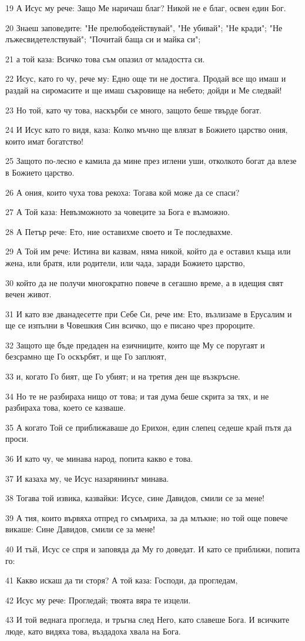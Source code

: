 \par 19 А Исус му рече: Защо Ме наричаш благ? Никой не е благ, освен един Бог.
\par 20 Знаеш заповедите: "Не прелюбодействувай", "Не убивай"; "Не кради"; "Не лъжесвидетелствувай"; "Почитай баща си и майка си";
\par 21 а той каза: Всичко това съм опазил от младостта си.
\par 22 Исус, като го чу, рече му: Едно още ти не достига. Продай все що имаш и раздай на сиромасите и ще имаш съкровище на небето; дойди и Ме следвай!
\par 23 Но той, като чу това, наскърби се много, защото беше твърде богат.
\par 24 И Исус като го видя, каза: Колко мъчно ще влязат в Божието царство ония, които имат богатство!
\par 25 Защото по-лесно е камила да мине през иглени уши, отколкото богат да влезе в Божието царство.
\par 26 А ония, които чуха това рекоха: Тогава кой може да се спаси?
\par 27 А Той каза: Невъзможното за човеците за Бога е възможно.
\par 28 А Петър рече: Ето, ние оставихме своето и Те последвахме.
\par 29 А Той им рече: Истина ви казвам, няма никой, който да е оставил къща или жена, или братя, или родители, или чада, заради Божието царство,
\par 30 който да не получи многократно повече в сегашно време, а в идещия свят вечен живот.
\par 31 И като взе дванадесетте при Себе Си, рече им: Ето, възлизаме в Ерусалим и ще се изпълни в Човешкия Син всичко, що е писано чрез пророците.
\par 32 Защото ще бъде предаден на езичниците, които ще Му се поругаят и безсрамно ще Го оскърбят, и ще Го заплюят,
\par 33 и, когато Го бият, ще Го убият; и на третия ден ще възкръсне.
\par 34 Но те не разбираха нищо от това; и тая дума беше скрита за тях, и не разбираха това, което се казваше.
\par 35 А когато Той се приближаваше до Ерихон, един слепец седеше край пътя да проси.
\par 36 И като чу, че минава народ, попита какво е това.
\par 37 И казаха му, че Исус назарянинът минава.
\par 38 Тогава той извика, казвайки: Исусе, сине Давидов, смили се за мене!
\par 39 А тия, които вървяха отпред го смъмриха, за да млъкне; но той още повече викаше: Сине Давидов, смили се за мене!
\par 40 И тъй, Исус се спря и заповяда да Му го доведат. И като се приближи, попита го:
\par 41 Какво искаш да ти сторя? А той каза: Господи, да прогледам,
\par 42 Исус му рече: Прогледай; твоята вяра те изцели.
\par 43 И той веднага прогледа, и тръгна след Него, като славеше Бога. И всичките люде, като видяха това, въздадоха хвала на Бога.

